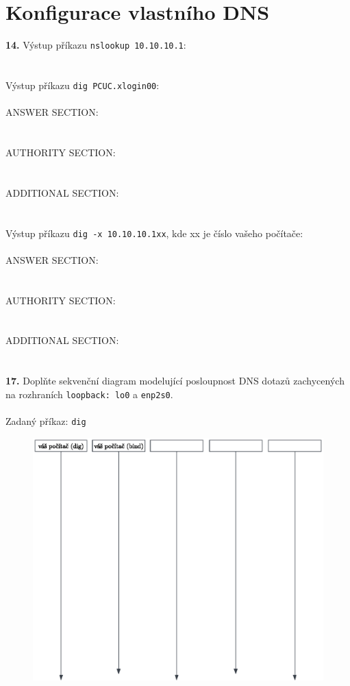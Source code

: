 \section{Konfigurace vlastního DNS}
\textbf{14.} Výstup příkazu \texttt{nslookup 10.10.10.1}:
\\
\\
\\
\hspace*{0.7cm} Výstup příkazu \texttt{dig PCUC.xlogin00}:
\\
\\
\hspace*{0.8cm}ANSWER SECTION:
\\
\\
\\
\hspace*{0.8cm}AUTHORITY SECTION:
\\
\\
\\
\hspace*{0.8cm}ADDITIONAL SECTION:
\\
\\
\\
\hspace*{0.7cm} Výstup příkazu \texttt{dig -x 10.10.10.1xx}, kde xx je číslo vašeho počítače:
\\
\\
\hspace*{0.8cm}ANSWER SECTION:
\\
\\
\\
\hspace*{0.8cm}AUTHORITY SECTION:
\\
\\
\\
\hspace*{0.8cm}ADDITIONAL SECTION:
\\
\\
\\
\textbf{17.} Doplňte sekvenční diagram modelující posloupnost DNS dotazů zachycených na rozhraních \texttt{loopback: lo0} a \texttt{enp2s0}.
\\
\\
\hspace*{0.8cm}Zadaný příkaz: \texttt{dig }\underline{\hspace{4.5cm}}
\begin{figure}[h]
	\centering
	\includegraphics[bb=0 365 550 130, clip=true]{dia.eps}
\end{figure}

